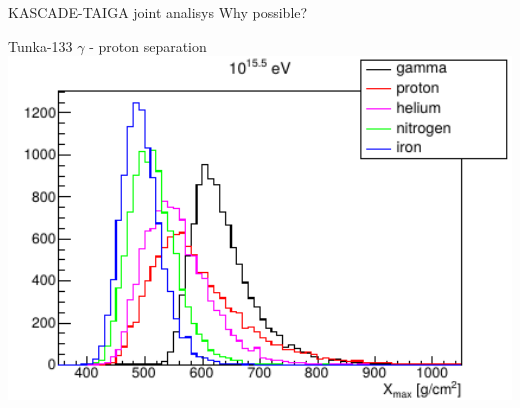 
% 

\begin{frame}{KASCADE-TAIGA joint analisys}
 Why possible?
\end{frame}

\begin{frame}{Tunka-133 $\gamma$ - proton separation}
  \includegraphics[width=1\textwidth]{pics/tunka_gamma_cr_diff.pdf}
\end{frame}

